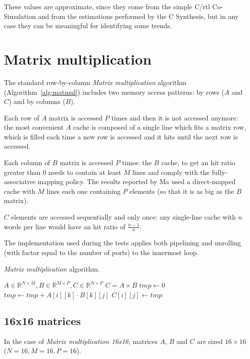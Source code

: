 \documentclass[11pt,a4paper,oneside]{memoir}
\begin{document}
These values are approximate, since they come from the simple C/\ac{rtl}
Co-Simulation and from the estimations performed by the C Synthesis, but in any
case they can be meaningful for identifying some trends.

\section{Matrix multiplication}
The standard row-by-column \emph{Matrix multiplication} algorithm
(Algorithm~\ref{alg:matmul}) includes two memory access patterns: by rows ($A$
and $C$) and by columns ($B$).

Each row of $A$ matrix is accessed $P$ times and then it is not accessed
anymore: the most convenient $A$ cache is composed of a single line which fits a
matrix row, which is filled each time a new row is accessed and it hits until
the next row is accessed.

Each column of $B$ matrix is accessed $P$ times: the $B$ cache, to get an hit
ratio greater than 0 needs to contain at least $M$ lines and comply with the
fully-associative mapping policy.
The results reported by Ma used a direct-mapped cache with $M$ lines each one
containing $P$ elements (so that it is as big as the $B$ matrix).

$C$ elements are accessed sequentially and only once: any single-line cache with
$n$ words per line would have an hit ratio of $\frac{n - 1}{n}$.

\bigskip
The implementation used during the tests applies both pipelining and unrolling
(with factor equal to the number of ports) to the innermost loop.

\begin{algorithm}
	\caption{\emph{Matrix multiplication} algorithm.}\label{alg:matmul}
	\begin{algorithmic}
		\Require $A \in \mathbb{R}^{N \times M},
		B \in \mathbb{R}^{M \times P}, C \in \mathbb{R}^{N \times P}$
		\Ensure $C = A \times B$
					\State $tmp \gets 0$
						\State $tmp \gets tmp +
							A[i][k] \cdot B[k][j]$
					\EndFor
					\State $C[i][j] \gets tmp$
				\EndFor
			\EndFor
		\EndProcedure
	\end{algorithmic}
\end{algorithm}

\subsection{16x16 matrices}
In the case of \emph{Matrix multiplication 16x16}, matrices $A$, $B$ and $C$ are
sized $16 \times 16$ ($N = 16, M = 16, P = 16$).
\end{document}
